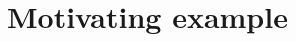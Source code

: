 \documentclass[preprint,12pt]{elsarticle}
\begin{document}
%
%

\section{Motivating example}%
\label{sec:case_study}
\end{document}
